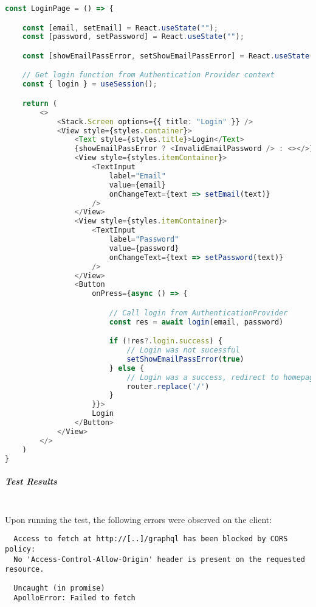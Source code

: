 \documentclass[../../main.tex]{subfiles}
\begin{document}
\begin{lstlisting}[language=typescript]
  const LoginPage = () => {

    const [email, setEmail] = React.useState("");
    const [password, setPassword] = React.useState("");

    const [showEmailPassError, setShowEmailPassError] = React.useState(false)

    // Get login function from Authentication Provider context
    const { login } = useSession();

    return (
        <>
            <Stack.Screen options={{ title: "Login" }} />
            <View style={styles.container}>
                <Text style={styles.title}>Login</Text>
                {showEmailPassError ? <InvalidEmailPassword /> : <></>}
                <View style={styles.itemContainer}>
                    <TextInput
                        label="Email"
                        value={email}
                        onChangeText={text => setEmail(text)}
                    />
                </View>
                <View style={styles.itemContainer}>
                    <TextInput
                        label="Password"
                        value={password}
                        onChangeText={text => setPassword(text)}
                    />
                </View>
                <Button
                    onPress={async () => {

                        // Call login from AuthenticationProvider
                        const res = await login(email, password)

                        if (!res?.login.success) {
                            // Login was not sucessful
                            setShowEmailPassError(true)
                        } else {
                            // Login was a success, redirect to homepage.
                            router.replace('/')
                        }
                    }}>
                    Login
                </Button>
            </View>
        </>
    )
}
\end{lstlisting}

\subparagraph{Test Results}

\noindent \\ Upon running the test, the following errors were observed
on the client:

\begin{lstlisting}
  Access to fetch at http://[..]/graphql has been blocked by CORS policy:
  No 'Access-Control-Allow-Origin' header is present on the requested resource.
\end{lstlisting}
\begin{lstlisting}
  Uncaught (in promise)
  ApolloError: Failed to fetch
\end{lstlisting}
\end{document}
